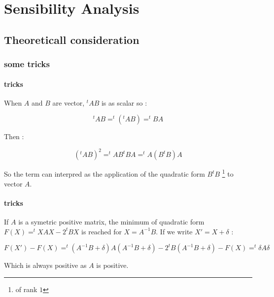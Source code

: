 \chapter{Sensibility Analysis}


\section{Theoreticall consideration}

\subsection{some tricks}

\subsubsection{tricks}
When $A$ and $B$ are vector, $^t A  B$ is as scalar so :


\begin{equation}
     ^t A B = ^t (^t A B) = ^t B A  \label{Trick:tABEqtBA}
\end{equation}

Then  :

\begin{equation}
     (^t A  B) ^2 =  ^t A B ^t B A  = ^t A (B ^t B) A \label{Trick:tAB2}
\end{equation}

So the term can interpred as the application of the quadratic form $B ^t B$  \footnote{of rank $1$}  to vector $A$.

\subsubsection{tricks}

If $A$ is a symetric positive matrix,
the minimum of quadratic form $F(X) = ^t X A X - 2^t B X$ is reached for $X=A^{-1} B$.
If we write $X' = X + \delta $ :

\begin{equation}
  F(X') -F(X)  = ^t (A^{-1} B+\delta) A (A^{-1} B+\delta) -  2^t B (A^{-1} B + \delta) -F(X)
          =  ^t \delta A \delta 
\end{equation}

Which is always positive as $A$ is positive.

